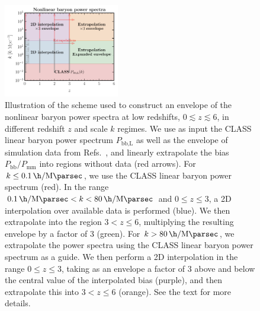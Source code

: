 \documentclass[prd,aps,10pt,nofootinbib,twocolumn,superscriptaddress,preprintnumbers,balancelastpage,longbibliography]{revtex4-1}
\begin{document}
%
\begin{figure}[tbp]
    \centering
    \includegraphics[width=0.45\textwidth]{plots/nonlin_baryon_PS_scheme}
    \caption{Illustration of the scheme used to construct an envelope of the nonlinear baryon power spectra at low redshifts, $0 \lesssim z \lesssim 6$, in different redshift $z$ and scale $k$ regimes. We use as input the CLASS linear baryon power spectrum $P_{\text{bb,L}}$ as well as the envelope of simulation data from Refs.~\cite{vanDaalen:2019pst,Foreman:2019ahr}, and linearly extrapolate the bias $P_\text{bb}/P_\text{mm}$ into regions without data (red arrows). For $k \leq \SI{0.1}{\h\per\mega\parsec}$, we use the CLASS linear baryon power spectrum (red). In the range $\SI{0.1}{\h\per\mega\parsec} < k < \SI{80}{\h\per\mega\parsec}$ and $0 \leq z \leq 3$, a 2D interpolation over available data is performed (blue). We then extrapolate into the region $3 < z \leq 6$, multiplying the resulting envelope by a factor of 3 (green). For $k > \SI{80}{\h\per\mega\parsec}$, we extrapolate the power spectra using the CLASS linear baryon power spectrum as a guide. We then perform a 2D interpolation in the range $0 \leq z \leq 3$, taking as an envelope a factor of 3 above and below the central value of the interpolated bias (purple), and then extrapolate this into $3 < z \leq 6$ (orange). See the text for more details.~} 
    \label{fig:franken_grid}
\end{figure}
%
\end{document}
